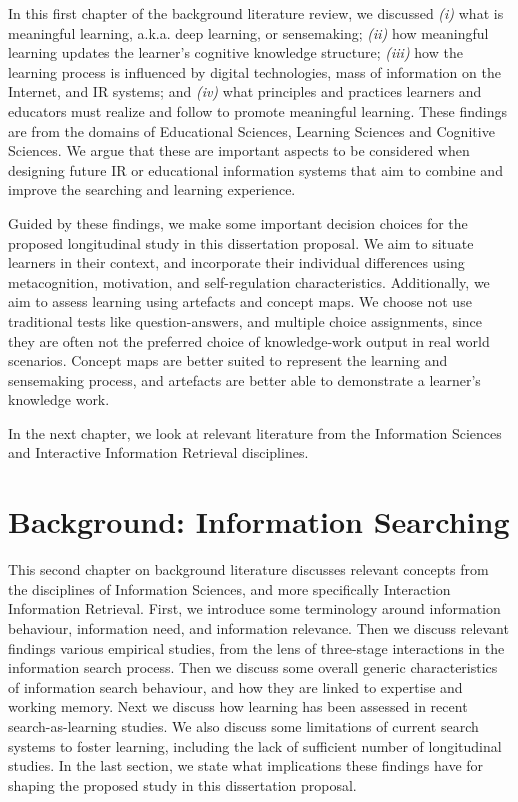 \documentclass[letterpaper, nobind]{templates/ociamthesis}
\begin{document}
In this first chapter of the background literature review, we discussed
\emph{(i)} what is meaningful learning, a.k.a. deep learning, or sensemaking;
\emph{(ii)} how meaningful learning updates the learner's cognitive knowledge
structure; \emph{(iii)} how the learning process is influenced by digital
technologies, mass of information on the Internet, and IR systems; and
\emph{(iv)} what principles and practices learners and educators must realize
and follow to promote meaningful learning. These findings are from the
domains of Educational Sciences, Learning Sciences and Cognitive
Sciences. We argue that these are important aspects to be considered
when designing future IR or educational information systems that aim to
combine and improve the searching and learning experience.

Guided by these findings, we make some important decision choices for
the proposed longitudinal study in this dissertation proposal. We aim to
situate learners in their context, and incorporate their individual
differences using metacognition, motivation, and self-regulation
characteristics. Additionally, we aim to assess learning using artefacts
and concept maps. We choose not use traditional tests like
question-answers, and multiple choice assignments, since they are often
not the preferred choice of knowledge-work output in real world
scenarios. Concept maps are better suited to represent the learning and
sensemaking process, and artefacts are better able to demonstrate a
learner's knowledge work.

In the next chapter, we look at relevant literature from the Information
Sciences and Interactive Information Retrieval disciplines.

\hypertarget{ch-bg-search}{%
\chapter{Background: Information Searching}\label{ch-bg-search}}

This second chapter on background literature discusses relevant concepts
from the disciplines of Information Sciences, and more specifically
Interaction Information Retrieval. First, we introduce some terminology
around information behaviour, information need, and information
relevance. Then we discuss relevant findings various empirical studies,
from the lens of three-stage interactions in the information search
process. Then we discuss some overall generic characteristics of
information search behaviour, and how they are linked to expertise and
working memory. Next we discuss how learning has been assessed in recent
search-as-learning studies. We also discuss some limitations of current
search systems to foster learning, including the lack of sufficient
number of longitudinal studies. In the last section, we state what
implications these findings have for shaping the proposed study in this
dissertation proposal.
\end{document}
